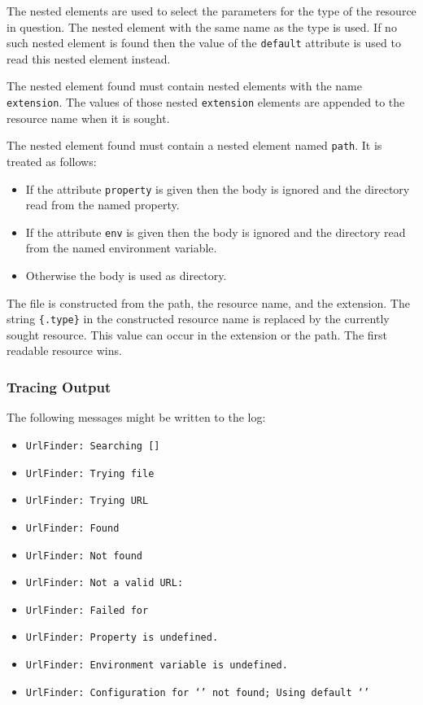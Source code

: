 The nested elements are used to select the parameters for the type of
the resource in question. The nested element with the same name as the
type is used. If no such nested element is found then the value of the
\texttt{default} attribute is used to read this nested element
instead. 

The nested element found must contain nested elements with the name
\texttt{extension}. The values of those nested \texttt{extension}
elements are appended to the resource name when it is sought.

The nested element found must contain a nested element named
\texttt{path}. It is treated as follows:
\begin{itemize}
\item If the attribute \texttt{property} is given then the body is
  ignored and the directory read from the named property.
\item If the attribute \texttt{env} is given then the body is ignored
  and the directory read from the named environment variable.
\item Otherwise the body is used as directory.
\end{itemize}

The file is constructed from the path, the resource name, and the
extension. The string \verb|{.type}| in the constructed resource name
is replaced by the currently sought resource. This value can occur in
the extension or the path. The first readable resource wins.

\subsubsection*{Tracing Output}

The following messages might be written to the log:

{\small
\begin{itemize}
\item{\tt UrlFinder: Searching  []}
\item{\tt UrlFinder: Trying file }
\item{\tt UrlFinder: Trying URL }
\item{\tt UrlFinder: Found }
\item{\tt UrlFinder: Not found }
\item{\tt UrlFinder: Not a valid URL: }
\item{\tt UrlFinder: Failed for }
\item{\tt UrlFinder: Property  is undefined.}
\item{\tt UrlFinder: Environment variable  is undefined.}
\item{\tt UrlFinder: Configuration for `' not found;
    Using default `'}
\end{itemize}}

